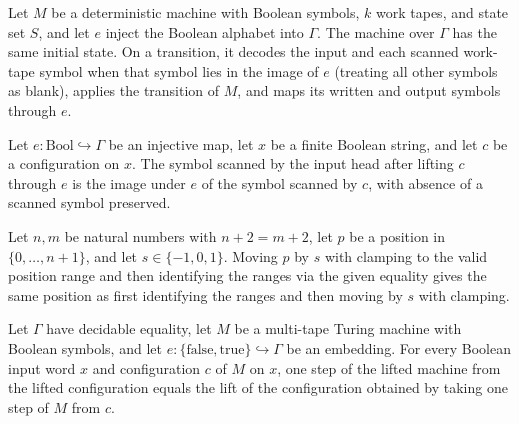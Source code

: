 \begin{definition}
\label{Turing.MultiTapeTM.liftSymbols}
\leanok
{}
Let $M$ be a deterministic machine with Boolean symbols, $k$ work tapes, and state set
$S$, and let $e$ inject the Boolean alphabet into $\Gamma$. The machine over $\Gamma$
has the same initial state. On a transition, it decodes the input and each scanned
work-tape symbol when that symbol lies in the image of $e$ (treating all other symbols
as blank), applies the transition of $M$, and maps its written and output symbols
through $e$.
\end{definition}

\begin{lemma}
\label{Turing.Cfg.liftSymbols_inputSymbol}
\leanok
{}
Let $e:\mathrm{Bool}\hookrightarrow\Gamma$ be an injective map, let $x$ be a finite Boolean string, and let
$c$ be a configuration on $x$. The symbol scanned by the input head after lifting $c$
through $e$ is the image under $e$ of the symbol scanned by $c$, with absence of a
scanned symbol preserved.
\end{lemma}

\begin{lemma}
\label{Turing.moveInputPos_cast}
\leanok
{}
Let $n,m$ be natural numbers with $n+2=m+2$, let $p$ be a position in
$\{0,\ldots,n+1\}$, and let $s\in\{-1,0,1\}$. Moving $p$ by $s$ with clamping to the
valid position range and then identifying the ranges via the given equality gives the
same position as first identifying the ranges and then moving by $s$ with clamping.
\end{lemma}

\begin{lemma}
\label{Turing.MultiTapeTM.liftSymbols_step}
\leanok
{}
Let $\Gamma$ have decidable equality, let $M$ be a multi-tape Turing machine with
Boolean symbols, and let $e:\{\mathrm{false},\mathrm{true}\}\hookrightarrow\Gamma$ be an
embedding. For every Boolean input word $x$ and configuration $c$ of $M$ on $x$, one
step of the lifted machine from the lifted configuration equals the lift of the
configuration obtained by taking one step of $M$ from $c$.
\end{lemma}

